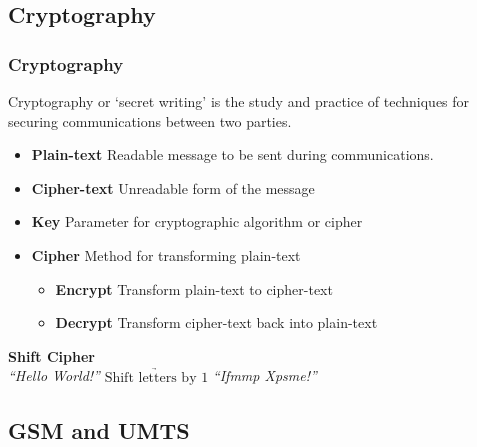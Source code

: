\documentclass{beamer}
\begin{document}
\subsection{Cryptography}
	\begin{frame}
	\frametitle{Cryptography}
	
		Cryptography or `secret writing' is the study and practice of techniques for securing communications between two parties. \linebreak
		\begin{itemize}
			\item \textbf{Plain-text}  Readable message to be sent during communications.
			\item \textbf{Cipher-text} Unreadable form of the message
			\item \textbf{Key} Parameter for cryptographic algorithm or cipher		
			\item \textbf{Cipher} Method for transforming plain-text
			\begin{itemize}
				\item \textbf{Encrypt} Transform plain-text to cipher-text
				\item \textbf{Decrypt} Transform cipher-text back into plain-text
			\end{itemize}
		\end{itemize}		
		\textbf{Shift Cipher}\\

		\textit{``Hello World!''} $\underrightarrow{\text{Shift letters by 1}}$ \textit{``Ifmmp Xpsme!''} 
	
	\end{frame}
%	
\subsection{GSM and UMTS}
	
\end{document}
